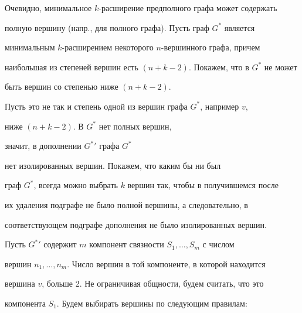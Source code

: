 \begin{pf}


Очевидно, минимальное $k$-расширение предполного графа может содержать


полную вершину (напр., для полного графа). Пусть граф $G^*$ является


минимальным $k$-расширением некоторого $n$-вершинного графа, причем


наибольшая из степеней вершин есть $(n+k-2)$. Покажем, что в $G^*$ не может


быть вершин со степенью ниже $(n+k-2)$.





Пусть это не так и степень одной из вершин графа $G^*$, например $v$,


ниже $(n+k-2)$. В $G^*$ нет полных вершин,


значит, в дополнении $G^*{}'$ графа $G^*$


нет изолированных вершин. Покажем, что каким бы ни был


граф $G^*$, всегда можно выбрать $k$ вершин так, чтобы в получившемся после


их удаления подграфе не было полной вершины, а следовательно, в


соответствующем подграфе дополнения не было изолированных вершин.





Пусть $G^*{}'$ содержит $m$ компонент связности $S_1, \dotsc, S_m$ с числом


вершин $n_1,\dotsc, n_m$. Число вершин в той компоненте, в которой находится


вершина $v$, больше 2. Не ограничивая общности, будем считать, что это


компонента $S_1$. Будем выбирать вершины по следующим правилам:


\end{pf}
